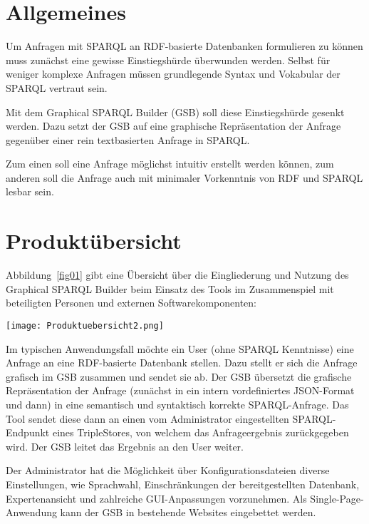 \section{Allgemeines}

Um Anfragen mit SPARQL an RDF-basierte Datenbanken formulieren zu
können muss zunächst eine gewisse Einstiegshürde überwunden werden.
Selbst für weniger komplexe Anfragen müssen grundlegende Syntax und
Vokabular der SPARQL vertraut sein.

Mit dem Graphical SPARQL Builder (GSB) soll diese Einstiegshürde gesenkt
werden.
Dazu setzt der GSB auf eine graphische Repräsentation der Anfrage
gegenüber einer rein textbasierten Anfrage in SPARQL.

Zum einen soll eine Anfrage möglichst intuitiv erstellt werden können,
zum anderen soll die Anfrage auch mit minimaler Vorkenntnis von RDF
und SPARQL lesbar sein.

\section{Produktübersicht}

Abbildung~\ref{fig01} gibt eine Übersicht über die Eingliederung und Nutzung des Graphical SPARQL Builder beim Einsatz des Tools im Zusammenspiel mit beteiligten Personen und externen Softwarekomponenten:

\begin{SCfigure}[20][!b]%
\texttt{[image: Produktuebersicht2.png]}
\caption{Beziehung des GSB zu Anwender, Datenbank und Administration.}
\label{fig01}
\end{SCfigure}

Im typischen Anwendungsfall möchte ein User (ohne SPARQL Kenntnisse)
eine Anfrage an eine RDF-basierte Datenbank stellen. 
Dazu stellt er sich die Anfrage grafisch im GSB zusammen und sendet
sie ab. Der GSB übersetzt die grafische Repräsentation der Anfrage
(zunächst in ein intern vordefiniertes JSON-Format und dann) in eine
semantisch und syntaktisch korrekte SPARQL-Anfrage. 
Das Tool sendet diese dann an einen vom Administrator eingestellten
SPARQL-Endpunkt eines TripleStores, von welchem das Anfrageergebnis
zurückgegeben wird. Der GSB leitet das Ergebnis an den User weiter.

Der Administrator hat die Möglichkeit über Konfigurationsdateien
diverse Einstellungen, wie Sprachwahl, Einschränkungen der
bereitgestellten Datenbank, Expertenansicht und zahlreiche
GUI-Anpassungen vorzunehmen.
Als Single-Page-Anwendung kann der GSB in bestehende Websites eingebettet werden.


